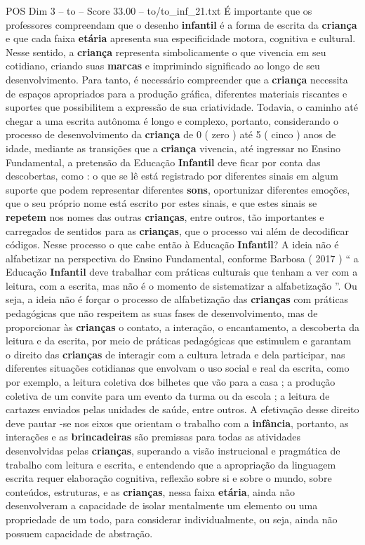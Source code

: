 \begin{textsample}{POS Dim 3 – to – Score 33.00 – to/to\_inf\_21.txt}
É importante que os professores compreendam que o desenho \textbf{infantil} é a forma de escrita da \textbf{criança} e que cada faixa \textbf{etária} apresenta sua especificidade motora, cognitiva e cultural.
Nesse sentido, a \textbf{criança} representa simbolicamente o que vivencia em seu cotidiano, criando suas \textbf{marcas} e imprimindo significado ao longo de seu desenvolvimento.
Para tanto, é necessário compreender que a \textbf{criança} necessita de espaços apropriados para a produção gráfica, diferentes materiais riscantes e suportes que possibilitem a expressão de sua criatividade.
Todavia, o caminho até chegar a uma escrita autônoma é longo e complexo, portanto, considerando o processo de desenvolvimento da \textbf{criança} de 0 ( zero ) até 5 ( cinco ) anos de idade, mediante as transições que a \textbf{criança} vivencia, até ingressar no Ensino Fundamental, a pretensão da Educação \textbf{Infantil} deve ficar por conta das descobertas, como : o que se lê está registrado por diferentes sinais em algum suporte que podem representar diferentes \textbf{sons}, oportunizar diferentes emoções, que o seu próprio nome está escrito por estes sinais, e que estes sinais se \textbf{repetem} nos nomes das outras \textbf{crianças}, entre outros, tão importantes e carregados de sentidos para as \textbf{crianças}, que o processo vai além de decodificar códigos.
Nesse processo o que cabe então à Educação \textbf{Infantil}?
A ideia não é alfabetizar na perspectiva do Ensino Fundamental, conforme Barbosa ( 2017 ) “ a Educação \textbf{Infantil} deve trabalhar com práticas culturais que tenham a ver com a leitura, com a escrita, mas não é o momento de sistematizar a alfabetização ”.
Ou seja, a ideia não é forçar o processo de alfabetização das \textbf{crianças} com práticas pedagógicas que não respeitem as suas fases de desenvolvimento, mas de proporcionar às \textbf{crianças} o contato, a interação, o encantamento, a descoberta da leitura e da escrita, por meio de práticas pedagógicas que estimulem e garantam o direito das \textbf{crianças} de interagir com a cultura letrada e dela participar, nas diferentes situações cotidianas que envolvam o uso social e real da escrita, como por exemplo, a leitura coletiva dos bilhetes que vão para a casa ; a produção coletiva de um convite para um evento da turma ou da escola ; a leitura de cartazes enviados pelas unidades de saúde, entre outros.
A efetivação desse direito deve pautar -se nos eixos que orientam o trabalho com a \textbf{infância}, portanto, as interações e as \textbf{brincadeiras} são premissas para todas as atividades desenvolvidas pelas \textbf{crianças}, superando a visão instrucional e pragmática de trabalho com leitura e escrita, e entendendo que a apropriação da linguagem escrita requer elaboração cognitiva, reflexão sobre si e sobre o mundo, sobre conteúdos, estruturas, e as \textbf{crianças}, nessa faixa \textbf{etária}, ainda não desenvolveram a capacidade de isolar mentalmente um elemento ou uma propriedade de um todo, para considerar individualmente, ou seja, ainda não possuem capacidade de abstração.

\end{textsample}
